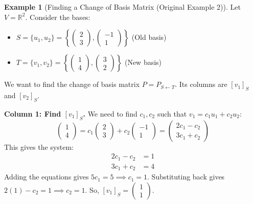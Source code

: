 \documentclass[11pt]{article}
\theoremstyle{definition}
\newtheorem{example}[theorem]{Example}
\theoremstyle{remark}
\newcommand{\R}{\mathbb{R}}
\newcommand{\Rn}[1]{\R^{#1}}
\newcommand{\coord}[2]{[#1]_{#2}} %
\begin{document}
\begin{example}[Finding a Change of Basis Matrix (Original Example 2)]
    Let $V = \Rn{2}$. Consider the bases:
    \begin{itemize}
        \item $S = \{u_1, u_2\} = \left\{ \begin{pmatrix} 2 \\ 3 \end{pmatrix}, \begin{pmatrix} -1 \\ 1 \end{pmatrix} \right\}$ (Old basis)
        \item $T = \{v_1, v_2\} = \left\{ \begin{pmatrix} 1 \\ 4 \end{pmatrix}, \begin{pmatrix} 3 \\ 2 \end{pmatrix} \right\}$ (New basis)
    \end{itemize}
    We want to find the change of basis matrix $P = P_{S \leftarrow T}$. Its columns are $\coord{v_1}{S}$ and $\coord{v_2}{S}$.

    \textbf{Column 1: Find $\coord{v_1}{S}$.} We need to find $c_1, c_2$ such that $v_1 = c_1 u_1 + c_2 u_2$:
    \[ \begin{pmatrix} 1 \\ 4 \end{pmatrix} = c_1 \begin{pmatrix} 2 \\ 3 \end{pmatrix} + c_2 \begin{pmatrix} -1 \\ 1 \end{pmatrix} = \begin{pmatrix} 2c_1 - c_2 \\ 3c_1 + c_2 \end{pmatrix} \]
    This gives the system:
    \begin{align*} 2c_1 - c_2 &= 1 \\ 3c_1 + c_2 &= 4 \end{align*}
    Adding the equations gives $5c_1 = 5 \implies c_1 = 1$. Substituting back gives $2(1) - c_2 = 1 \implies c_2 = 1$.
    So, $\coord{v_1}{S} = \begin{pmatrix} 1 \\ 1 \end{pmatrix}$.


\end{example}
\end{document}
